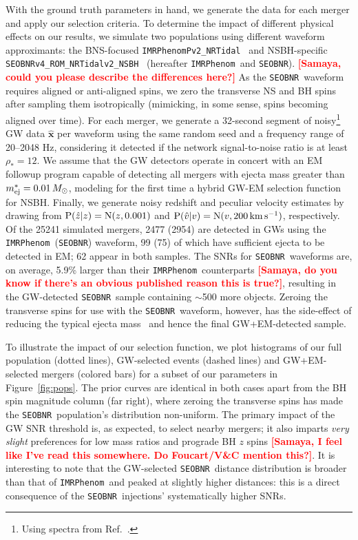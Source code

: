\documentclass[%
 reprint,
 superscriptaddress,
 nofootinbib,
 amsmath,amssymb,
 aps,
]{revtex4-2}
\newcommand{\vobs}{\ensuremath{\hat{v}}}
\newcommand{\zobs}{\ensuremath{\hat{z}}}
\newcommand{\prob}{\ensuremath{{\rm P}}}
\newcommand{\normal}{{\rm{N}}}
\newcommand{\snrmin}{\rho_*}
\newcommand{\mejmin}{m_{\rm ej}^*}
\newcommand{\dgw}{\hat{\bm{x}}}
\newcommand{\kms}{\ensuremath{{\rm km\,s^{-1}}}}
\newcommand{\seobnr}{\texttt{SEOBNR}}
\newcommand{\seobnrfull}{\texttt{SEOBNRv4\_ROM\_NRTidalv2\_NSBH}}
\newcommand{\imrp}{\texttt{IMRPhenom}}
\newcommand{\imrpfull}{\texttt{IMRPhenomPv2\_NRTidal}}
\newcommand{\smf}[1]{\textcolor{red}{\bf [#1]}}
\begin{document}
With the ground truth parameters in hand, we generate the data for each merger and apply our selection criteria.  To determine the impact of different physical effects on our results, we simulate two populations using different waveform approximants: the BNS-focused \imrpfull~\cite{Dietrich_etal:2019} and NSBH-specific \seobnrfull~\cite{Matas_etal:2020} (hereafter \imrp\ and \seobnr). \smf{Samaya, could you please describe the differences here?} As the \seobnr\ waveform requires aligned or anti-aligned spins, we zero the transverse NS and BH spins after sampling them isotropically (mimicking, in some sense, spins becoming aligned over time). For each merger, we generate a 32-second segment of noisy\footnote{Using spectra from Ref.~\cite{LVCnoise}.} GW data $\dgw$ per waveform using the same random seed and a frequency range of 20--2048 Hz, considering it detected if the network signal-to-noise ratio is at least $\snrmin = 12$. We assume that the GW detectors operate in concert with an EM followup program capable of detecting all mergers with ejecta mass greater than $\mejmin = 0.01\,M_\odot$, modeling for the first time a hybrid GW-EM selection function for NSBH. Finally, we generate noisy redshift and peculiar velocity estimates by drawing from $\prob(\zobs|z)=\normal(z,0.001)$ and $\prob(\vobs|v)=\normal(v,200\,\kms)$, respectively. Of the 25241 simulated mergers, 2477 (2954) are detected in GWs using the \imrp\ (\seobnr) waveform, 99 (75) of which have sufficient ejecta to be detected in EM; 62 appear in both samples. The SNRs for \seobnr\ waveforms are, on average, 5.9\% larger than their \imrp\ counterparts \smf{Samaya, do you know if there's an obvious published reason this is true?}, resulting in the GW-detected \seobnr\ sample containing $\sim$500 more objects. Zeroing the transverse spins for use with the \seobnr\ waveform, however, has the side-effect of reducing the typical ejecta mass~\cite{Foucart_etal:2018} and hence the final GW+EM-detected sample.

To illustrate the impact of our selection function, we plot histograms of our full population (dotted lines), GW-selected events (dashed lines) and GW+EM-selected mergers (colored bars) for a subset of our parameters in Figure~\ref{fig:pops}. The prior curves are identical in both cases apart from the BH spin magnitude column (far right), where zeroing the transverse spins has made the \seobnr\ population's distribution non-uniform. The primary impact of the GW SNR threshold is, as expected, to select nearby mergers; it also imparts {\it very slight} preferences for low mass ratios and prograde BH $z$ spins \smf{Samaya, I feel like I've read this somewhere. Do Foucart/V\&C mention this?}. It is interesting to note that the GW-selected \seobnr\ distance distribution is broader than that of \imrp\ and peaked at slightly higher distances: this is a direct consequence of the \seobnr\ injections' systematically higher SNRs.
\end{document}
